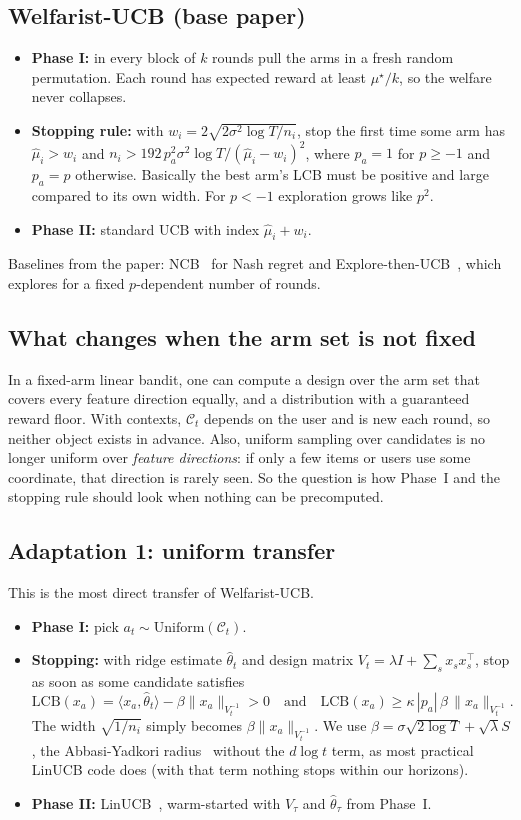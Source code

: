 \documentclass[11pt,a4paper]{article}
\begin{document}
\subsection{Welfarist-UCB (base paper)}
\begin{itemize}
  \item \textbf{Phase I:} in every block of $k$ rounds pull the arms in a fresh random permutation. Each round has expected reward at least $\mu^\star/k$, so the welfare never collapses.
  \item \textbf{Stopping rule:} with $w_i=2\sqrt{2\sigma^2\log T/n_i}$, stop the first time some arm has $\hat\mu_i>w_i$ and $n_i>192\,p_a^2\sigma^2\log T/(\hat\mu_i-w_i)^2$, where $p_a=1$ for $p\ge-1$ and $p_a=p$ otherwise. Basically the best arm's LCB must be positive and large compared to its own width. For $p<-1$ exploration grows like $p^2$.
  \item \textbf{Phase II:} standard UCB with index $\hat\mu_i+w_i$.
\end{itemize}
Baselines from the paper: NCB~\cite{barman2023} for Nash regret and Explore-then-UCB~\cite{krishna2025}, which explores for a fixed $p$-dependent number of rounds.

\subsection{What changes when the arm set is not fixed}
In a fixed-arm linear bandit, one can compute a design over the arm set that covers every feature direction equally, and a distribution with a guaranteed reward floor. With contexts, $\mathcal{C}_t$ depends on the user and is new each round, so neither object exists in advance. Also, uniform sampling over candidates is no longer uniform over \emph{feature directions}: if only a few items or users use some coordinate, that direction is rarely seen. So the question is how Phase~I and the stopping rule should look when nothing can be precomputed.

\subsection{Adaptation 1: uniform transfer}
This is the most direct transfer of Welfarist-UCB.
\begin{itemize}
  \item \textbf{Phase I:} pick $a_t\sim\mathrm{Uniform}(\mathcal{C}_t)$.
  \item \textbf{Stopping:} with ridge estimate $\hat\theta_t$ and design matrix $V_t=\lambda I+\sum_s x_sx_s^\top$, stop as soon as some candidate satisfies
  \[
  \mathrm{LCB}(x_a)=\langle x_a,\hat\theta_t\rangle-\beta\|x_a\|_{V_t^{-1}}>0
  \quad\text{and}\quad
  \mathrm{LCB}(x_a)\ge\kappa\,|p_a|\,\beta\,\|x_a\|_{V_t^{-1}} .
  \]
  The width $\sqrt{1/n_i}$ simply becomes $\beta\|x_a\|_{V_t^{-1}}$. We use $\beta=\sigma\sqrt{2\log T}+\sqrt{\lambda}S$, the Abbasi-Yadkori radius~\cite{abbasi2011} without the $d\log t$ term, as most practical LinUCB code does (with that term nothing stops within our horizons).
  \item \textbf{Phase II:} LinUCB~\cite{li2010}, warm-started with $V_\tau$ and $\hat\theta_\tau$ from Phase~I.
\end{itemize}
\end{document}
